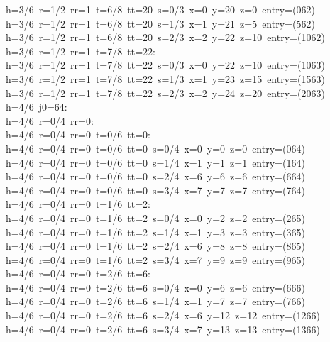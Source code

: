 \begin{tabbing}
h=3/6\ r=1/2\ rr=1\ t=6/8\ tt=20\ s=0/3\ x=0\ y=20\ z=0\ entry=(062)\\[0pt]
h=3/6\ r=1/2\ rr=1\ t=6/8\ tt=20\ s=1/3\ x=1\ y=21\ z=5\ entry=(562)\\[0pt]
h=3/6\ r=1/2\ rr=1\ t=6/8\ tt=20\ s=2/3\ x=2\ y=22\ z=10\ entry=(1062)\\[0pt]
h=3/6\ r=1/2\ rr=1\ t=7/8\ tt=22:\\[0pt]
h=3/6\ r=1/2\ rr=1\ t=7/8\ tt=22\ s=0/3\ x=0\ y=22\ z=10\ entry=(1063)\\[0pt]
h=3/6\ r=1/2\ rr=1\ t=7/8\ tt=22\ s=1/3\ x=1\ y=23\ z=15\ entry=(1563)\\[0pt]
h=3/6\ r=1/2\ rr=1\ t=7/8\ tt=22\ s=2/3\ x=2\ y=24\ z=20\ entry=(2063)\\[0pt]
h=4/6\ j0=64:\\[0pt]
h=4/6\ r=0/4\ rr=0:\\[0pt]
h=4/6\ r=0/4\ rr=0\ t=0/6\ tt=0:\\[0pt]
h=4/6\ r=0/4\ rr=0\ t=0/6\ tt=0\ s=0/4\ x=0\ y=0\ z=0\ entry=(064)\\[0pt]
h=4/6\ r=0/4\ rr=0\ t=0/6\ tt=0\ s=1/4\ x=1\ y=1\ z=1\ entry=(164)\\[0pt]
h=4/6\ r=0/4\ rr=0\ t=0/6\ tt=0\ s=2/4\ x=6\ y=6\ z=6\ entry=(664)\\[0pt]
h=4/6\ r=0/4\ rr=0\ t=0/6\ tt=0\ s=3/4\ x=7\ y=7\ z=7\ entry=(764)\\[0pt]
h=4/6\ r=0/4\ rr=0\ t=1/6\ tt=2:\\[0pt]
h=4/6\ r=0/4\ rr=0\ t=1/6\ tt=2\ s=0/4\ x=0\ y=2\ z=2\ entry=(265)\\[0pt]
h=4/6\ r=0/4\ rr=0\ t=1/6\ tt=2\ s=1/4\ x=1\ y=3\ z=3\ entry=(365)\\[0pt]
h=4/6\ r=0/4\ rr=0\ t=1/6\ tt=2\ s=2/4\ x=6\ y=8\ z=8\ entry=(865)\\[0pt]
h=4/6\ r=0/4\ rr=0\ t=1/6\ tt=2\ s=3/4\ x=7\ y=9\ z=9\ entry=(965)\\[0pt]
h=4/6\ r=0/4\ rr=0\ t=2/6\ tt=6:\\[0pt]
h=4/6\ r=0/4\ rr=0\ t=2/6\ tt=6\ s=0/4\ x=0\ y=6\ z=6\ entry=(666)\\[0pt]
h=4/6\ r=0/4\ rr=0\ t=2/6\ tt=6\ s=1/4\ x=1\ y=7\ z=7\ entry=(766)\\[0pt]
h=4/6\ r=0/4\ rr=0\ t=2/6\ tt=6\ s=2/4\ x=6\ y=12\ z=12\ entry=(1266)\\[0pt]
h=4/6\ r=0/4\ rr=0\ t=2/6\ tt=6\ s=3/4\ x=7\ y=13\ z=13\ entry=(1366)\\[0pt]

\end{tabbing}
